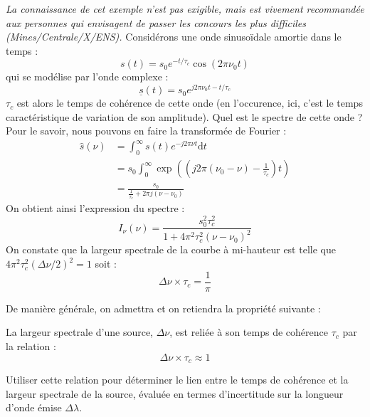 \documentclass[11pt,fleqn]{book} %
\newcommand{\dd}{\mathrm{d}}
\begin{document}
\begin{example}
\textit{La connaissance de cet exemple n'est pas exigible, mais est vivement recommandée aux personnes qui envisagent de passer les concours les plus difficiles (Mines/Centrale/X/ENS).}
Considérons une onde sinusoïdale amortie dans le temps :
	\begin{equation}
		s(t) = s_0 e^{-t/\tau_c} \cos(2 \pi \nu_0 t)
	\end{equation}
	qui se modélise par l'onde complexe :
	\begin{equation}
		\underline{s}(t) = s_0 e^{j 2 \pi \nu_0 t - t/\tau_c}
	\end{equation}
$\tau_c$ est alors le temps de cohérence de cette onde (en l'occurence, ici, c'est le temps caractéristique de variation de son amplitude).
Quel est le spectre de cette onde ? Pour le savoir, nous pouvons en faire la transformée de Fourier :
	\begin{align}
		\hat{s}(\nu) &= \int_0^\infty s(t) e^{-j 2 \pi \nu t} \dd t  \\
		&= s_0 \int_0^\infty  \exp\left( \left(j 2 \pi(\nu_0-\nu)-\frac{1}{\tau_c}\right)t \right)  \\
		&= \frac{s_0}{\frac{1}{\tau_c} + 2 \pi j(\nu-\nu_0)}
	\end{align}
On obtient ainsi l'expression du spectre :
	\begin{equation}
		I_\nu(\nu) = \frac{s_0^2 \tau_c^2}{1 + 4 \pi^2 \tau_c^2 (\nu-\nu_0)^2}
	\end{equation}
On constate que la largeur spectrale de la courbe à mi-hauteur est telle que $4 \pi^2 \tau_c^2 (\Delta \nu / 2)^2 = 1$ soit :
\begin{equation}
	\Delta \nu \times \tau_c = \frac{1}{\pi}
\end{equation} 
\end{example}

De manière générale, on admettra et on retiendra la propriété suivante :
\begin{proposition}
	La largeur spectrale d'une source, $\Delta \nu$, est reliée à son temps de cohérence $\tau_c$ par la relation :
	\begin{equation}
		\Delta \nu \times \tau_c \approx 1
	\end{equation}	
\end{proposition}

\begin{capex}
	Utiliser cette relation pour déterminer le lien entre le temps de cohérence et la largeur spectrale de la source, évaluée en termes d'incertitude sur la longueur d'onde émise $\Delta \lambda$.
\end{capex}
\end{document}
